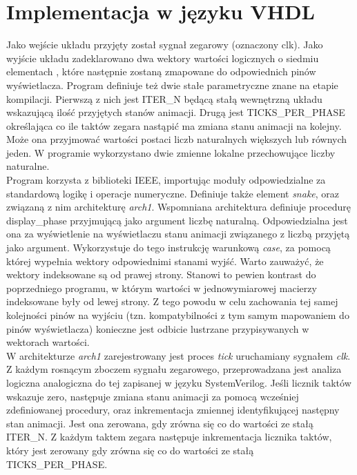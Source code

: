\documentclass{article}
\begin{document}
        
    \section{Implementacja w języku VHDL}
        Jako wejście układu przyjęty został sygnał zegarowy (oznaczony clk). Jako wyjście układu zadeklarowano dwa wektory wartości logicznych o siedmiu elementach , które następnie zostaną zmapowane do odpowiednich pinów wyświetlacza. Program definiuje też dwie stałe parametryczne znane na etapie kompilacji. Pierwszą z nich jest ITER\_N będącą stałą wewnętrzną układu wskazującą ilość przyjętych stanów animacji. Drugą jest TICKS\_PER\_PHASE określająca co ile taktów zegara nastąpić ma zmiana stanu animacji na kolejny. Może ona przyjmować wartości postaci liczb naturalnych większych lub równych jeden. W programie wykorzystano dwie zmienne lokalne przechowujące liczby naturalne.\\
        
        Program korzysta z biblioteki IEEE, importując moduły odpowiedzialne za standardową logikę i operacje numeryczne. Definiuje także element \textit{snake}, oraz związaną z nim architekturę \textit{arch1}. Wspomniana architektura definiuje procedurę display\_phase przyjmującą jako argument liczbę naturalną. Odpowiedzialna jest ona za wyświetlenie na wyświetlaczu stanu animacji związanego z liczbą przyjętą jako argument. Wykorzystuje do tego instrukcję warunkową \textit{case}, za pomocą której wypełnia wektory odpowiednimi stanami wyjść. Warto zauważyć, że wektory indeksowane są od prawej strony. Stanowi to pewien kontrast do poprzedniego programu, w którym wartości w jednowymiarowej macierzy indeksowane były od lewej strony. Z tego powodu w celu zachowania tej samej kolejności pinów na wyjściu (tzn. kompatybilności z tym samym mapowaniem do pinów wyświetlacza) konieczne jest odbicie lustrzane przypisywanych w wektorach wartości. \\
        
        
        W architekturze \textit{arch1} zarejestrowany jest proces \textit{tick} uruchamiany sygnałem \textit{clk}. Z każdym rosnącym zboczem 
        sygnału zegarowego, przeprowadzana jest analiza logiczna analogiczna do tej zapisanej w języku SystemVerilog. Jeśli licznik taktów wskazuje zero, następuje zmiana stanu animacji za pomocą wcześniej zdefiniowanej procedury, oraz inkrementacja zmiennej identyfikującej następny stan animacji. Jest ona zerowana, gdy zrówna się co do wartości ze stałą ITER\_N. Z każdym taktem zegara następuje inkrementacja licznika taktów, który jest zerowany gdy zrówna się co do wartości ze stałą TICKS\_PER\_PHASE. \\
        
\end{document}

